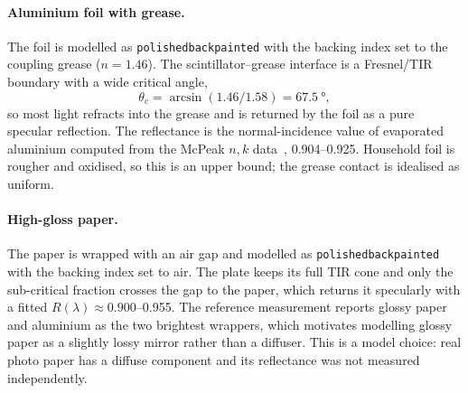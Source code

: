 \documentclass[preprint,12pt]{elsarticle}
\begin{document}
\paragraph{Aluminium foil with grease.}
The foil is modelled as \texttt{polishedbackpainted} with the backing index set
to the coupling grease ($n=1.46$). The scintillator--grease interface is a
Fresnel/TIR boundary with a wide critical angle,
\begin{equation*}
\theta_c=\arcsin(1.46/1.58)=\SI{67.5}{\degree},
\end{equation*}
so most light refracts into the grease and is returned by the foil as a pure
specular reflection. The reflectance is the
normal-incidence value of evaporated aluminium computed from the McPeak
$n,k$ data~\cite{McPeak2015}, \num{0.904}--\num{0.925}. Household foil is
rougher and oxidised, so this is an upper bound; the grease contact is idealised
as uniform.

\paragraph{High-gloss paper.}
The paper is wrapped with an air gap and modelled as
\texttt{polishedbackpainted} with the backing index set to air. The plate keeps
its full TIR cone and only the sub-critical fraction crosses the gap to the
paper, which returns it specularly with a fitted
$R(\lambda)\approx\num{0.900}$--\num{0.955}. The reference measurement reports
glossy paper and aluminium as the two brightest wrappers, which motivates
modelling glossy paper as a slightly lossy mirror rather than a diffuser. This
is a model choice: real photo paper has a diffuse component and its reflectance
was not measured independently.
\end{document}

